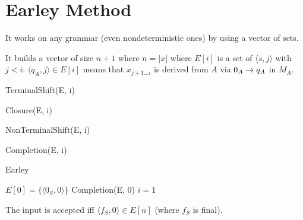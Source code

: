 \section{Earley Method}

It works on any grammar (even nondeterministic ones) by using a vector of sets.

It builds a vector of size $n+1$ where $n=|x|$ where $E[i]$ is a set of $\langle s,j \rangle$ with $j<i$: $\langle q_A,j \rangle \in E[i]$ means that $x_{j+1\ldots i}$ is derived from $A$ via $0_A\rightarrow q_A$ in $M_A$.

\begin{algorithm*}[H]
    \caption{TerminalShift(E, i)}
    \SetAlgoLined
\end{algorithm*}

\begin{algorithm*}[H]
    \caption{Closure(E, i)}
    \SetAlgoLined
\end{algorithm*}

\begin{algorithm*}[H]
    \caption{NonTerminalShift(E, i)}
    \SetAlgoLined
\end{algorithm*}

\begin{algorithm*}[H]
    \caption{Completion(E, i)}
    \SetAlgoLined
\end{algorithm*}

\begin{algorithm*}[H]
    \caption{Earley}
    \SetAlgoLined
    $E[0] = \{\langle 0_S, 0 \rangle \}$\;
    Completion(E, 0)\;
    $i = 1$\;
\end{algorithm*}

The input is accepted iff $\langle f_S, 0 \rangle \in E[n]$ (where $f_S$ is final).
